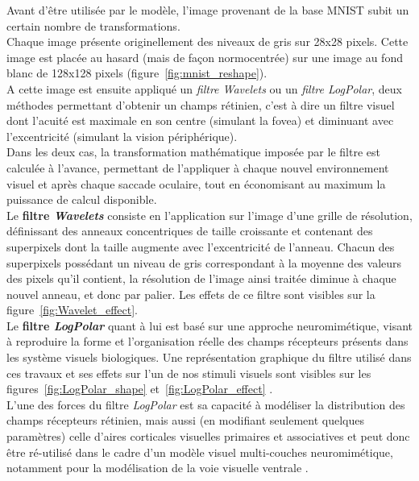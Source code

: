 Avant d'être utilisée par le modèle, l'image provenant de la base MNIST subit un certain nombre de transformations.\\
Chaque image présente originellement des niveaux de gris sur 28x28 pixels. Cette image est placée au hasard (mais de façon normocentrée) sur une image au fond blanc de 128x128 pixels (figure~\ref{fig:mnist_reshape}).\\
A cette image est ensuite appliqué un \textit{filtre Wavelets} ou un \textit{filtre LogPolar}, deux méthodes permettant d'obtenir un champs rétinien, c'est à dire un filtre visuel dont l'acuité est maximale en son centre (simulant la fovea) et diminuant avec l'excentricité (simulant la vision périphérique). \\
Dans les deux cas, la transformation mathématique imposée par le filtre est calculée à l'avance, permettant de l'appliquer à chaque nouvel environnement visuel et après chaque saccade oculaire, tout en économisant au maximum la puissance de calcul disponible.\autocite{Kortum1996}\\
Le \textbf{filtre \textit{Wavelets}} consiste en l'application sur l'image d'une grille de résolution, définissant des anneaux concentriques de taille croissante et contenant des superpixels dont la taille augmente avec l'excentricité de l'anneau. Chacun des superpixels possédant un niveau de gris correspondant à la moyenne des valeurs des pixels qu'il contient, la résolution de l'image ainsi traitée diminue à chaque nouvel anneau, et donc par palier.\autocite{Kortum1996}
Les effets de ce filtre sont visibles sur la figure~\ref{fig:Wavelet_effect}.\\
Le \textbf{filtre \textit{LogPolar}} quant à lui est basé sur une approche neuromimétique, visant à reproduire la forme et l'organisation réelle des champs récepteurs présents dans les système visuels biologiques. Une représentation graphique du filtre utilisé dans ces travaux et ses effets sur l'un de nos stimuli visuels sont visibles sur les figures~\ref{fig:LogPolar_shape} et~\ref{fig:LogPolar_effect} .\\
L'une des forces du filtre \textit{LogPolar} est sa capacité à modéliser la distribution des champs récepteurs rétinien, mais aussi (en modifiant seulement quelques paramètres) celle d'aires corticales visuelles primaires et associatives et peut donc être ré-utilisé dans le cadre d'un modèle visuel multi-couches neuromimétique, notamment pour la modélisation de la voie visuelle ventrale \autocite{Freeman2011}.

